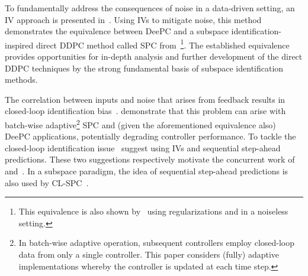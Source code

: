 To fundamentally address the consequences of noise in a data-driven setting, an \ac{IV} approach is presented in~\cite{vanWingerden2022}. %
Using \ac{IVs} to mitigate noise, this method %
demonstrates the equivalence between \ac{DeePC} and a subspace identification-inspired direct \ac{DDPC} method called \ac{SPC} from~\cite{Favoreel1999}\footnote{This equivalence is also shown by~\cite{Fiedler2021} using regularizations and in a noiseless setting.}. The established equivalence provides opportunities for in-depth analysis and further development of the direct \ac{DDPC} techniques by the strong fundamental basis of subspace identification methods. %

The correlation between inputs and noise that arises from feedback results in closed-loop identification bias~\citep{Soderstrom1989a}. %
\cite{Dinkla2023} demonstrate that this problem can arise with batch-wise adaptive\footnote{In batch-wise adaptive operation, subsequent controllers employ closed-loop data from only a single controller. This paper considers (fully) adaptive implementations whereby the controller is updated at each time step.} \ac{SPC} and (given the aforementioned equivalence also) \ac{DeePC} applications, potentially degrading controller performance. To tackle the closed-loop identification issue~\cite{Dinkla2023} suggest using \ac{IVs} and sequential step-ahead predictions. These two suggestions respectively motivate the concurrent work of~\cite{Wang2023} and~\cite{Shi2023}. In a subspace paradigm, the idea of sequential step-ahead predictions is also used by \acf{CL-SPC}~\citep{Dong2008}. %


